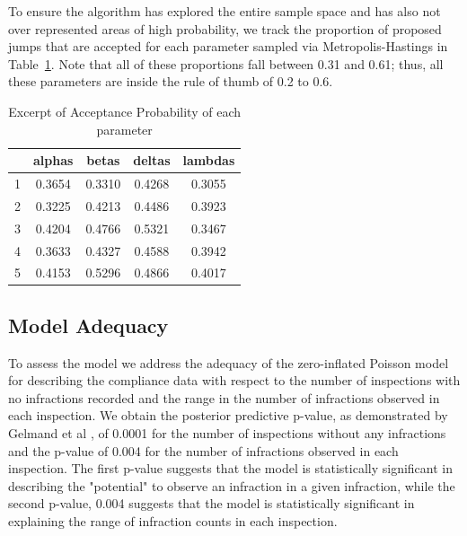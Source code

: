 \documentclass[twoside,onecolumn]{article}
\begin{document}
To ensure the algorithm has explored the entire sample space and has also not over represented areas of high probability, we track the proportion of proposed jumps that are accepted for each parameter sampled via Metropolis-Hastings in Table~\ref{table:acceptance_prob}. Note that all of these proportions fall between 0.31 and 0.61; thus, all these parameters are inside the rule of thumb of 0.2 to 0.6.

\begin{table}[ht]
\caption{Excerpt of Acceptance Probability of each parameter} %
\centering %
\begin{tabular}{c c c c c} %
\hline\hline %
 & alphas & betas & deltas & lambdas\\ [1ex] %
\hline %
1 & 0.3654 & 0.3310 & 0.4268 & 0.3055 \\ %
2 & 0.3225 & 0.4213 & 0.4486 & 0.3923 \\ 
3 & 0.4204 & 0.4766 & 0.5321 & 0.3467 \\
4 & 0.3633 & 0.4327 & 0.4588 & 0.3942 \\
5 & 0.4153 & 0.5296 & 0.4866 & 0.4017 \\ [1ex] %
\hline %
\end{tabular}
\label{table:acceptance_prob} %
\end{table}

\subsection{Model Adequacy}
To assess the model we address the adequacy of the zero-inflated Poisson model for describing the compliance data with respect to the number of inspections with no infractions recorded and the range in the number of infractions observed in each inspection. We obtain the posterior predictive p-value, as demonstrated by Gelmand et al \cite{Gelman2007}, of 0.0001 for the number of inspections without any infractions and the p-value of 0.004 for the number of infractions observed in each inspection. The first p-value suggests that the model is statistically significant in describing the "potential" to observe an infraction in a given infraction, while the second p-value, 0.004 suggests that the model is statistically significant in explaining the range of infraction counts in each inspection.
\end{document}
